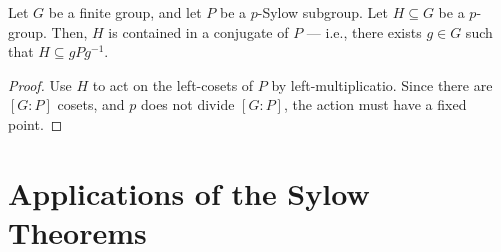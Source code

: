 \documentclass[10pt]{mypackage}
\begin{document}
\begin{theorem}
  Let $G$ be a finite group, and let $P$ be a $p$-Sylow subgroup. Let $H\subseteq G$ be a $p$-group. Then, $H$ is contained in a conjugate of $P$ --- i.e., there exists $g\in G$ such that $H\subseteq gPg^{-1}$.
\end{theorem}
\begin{proof}
  Use $H$ to act on the left-cosets of $P$ by left-multiplicatio. Since there are $\left[ G:P \right]$ cosets, and $p$ does not divide $\left[ G:P \right]$, the action must have a fixed point.
\end{proof}

\section{Applications of the Sylow Theorems}%
\end{document}
